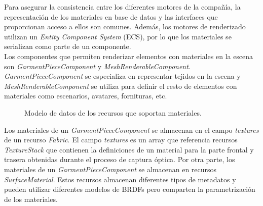 Para asegurar la consistencia entre los diferentes motores de la compa\~n\'ia, la representaci\'on de los materiales en base de
datos y las interfaces que proporcionan acceso a ellos son comunes. Adem\'as, los motores de renderizado utilizan un \textit{Entity Component System}
(ECS), por lo que los materiales se serializan como parte de un componente.\\

Los componentes que permiten renderizar elementos con materiales en la escena son \textit{GarmentPieceComponent} y \textit{MeshRenderableComponent}.
\textit{GarmentPieceComponent} se especializa en representar tejidos en la escena y \textit{MeshRenderableComponent}
se utiliza para definir el resto de elementos con materiales como escenarios, avatares, fornituras, etc.

\begin{figure}[H]
  \vspace{0.5cm}
  \centering
  \caption{Modelo de datos de los recursos que soportan materiales.}
  \vspace{0.5cm}
\end{figure}

Los materiales de un \textit{GarmentPieceComponent} se almacenan en el campo \textit{textures} de un recurso \textit{Fabric}. El campo
\textit{textures} es un array que referencia recursos \textit{TextureStack} que contienen la definiciones de un material para
la parte frontal y trasera obtenidas durante el proceso de captura \'optica. Por otra parte, los materiales de un \textit{GarmentPieceComponent}
se almacenan en recursos \textit{SurfaceMaterial}. Estos recursos almacenan diferentes tipos de metadatos y pueden utilizar
diferentes modelos de BRDFs pero comparten la parametrizaci\'on de los materiales.








